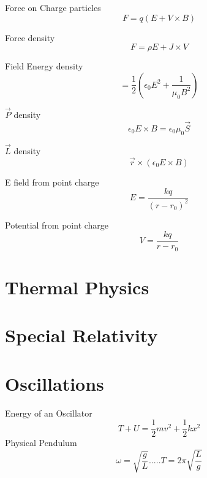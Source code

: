 \documentclass{article}
\begin{document}
Force on Charge particles\begin{equation}F=q(E+V\times B)\end{equation}

Force density\begin{equation}F=\rho E + J\times V\end{equation}

Field Energy density\begin{equation}=\frac{1}{2} (\epsilon_0 E^2 + \frac{1}{\mu_0 B^2})\end{equation}

$\vec{P}$ density \begin{equation}\epsilon_0 E \times B = \epsilon_0 \mu_0 \vec{S}\end{equation}

$\vec{L}$ density\begin{equation}\vec{r}\times (\epsilon_0 E \times B)\end{equation}

E field from point charge\begin{equation}E=\frac{kq}{(r-r_0)^2}\end{equation}

Potential from point charge\begin{equation}V=\frac{kq}{r-r_0}\end{equation}










\section{Thermal Physics}









\section{Special Relativity}









\section{Oscillations}
Energy of an Oscillator\begin{equation}T+U=\frac{1}{2}mv^2 + \frac{1}{2}kx^2\end{equation}
Physical Pendulum\begin{equation}\omega = \sqrt{\frac{g}{L}}.....T=2\pi \sqrt{\frac{L}{g}}\end{equation}
\end{document}
